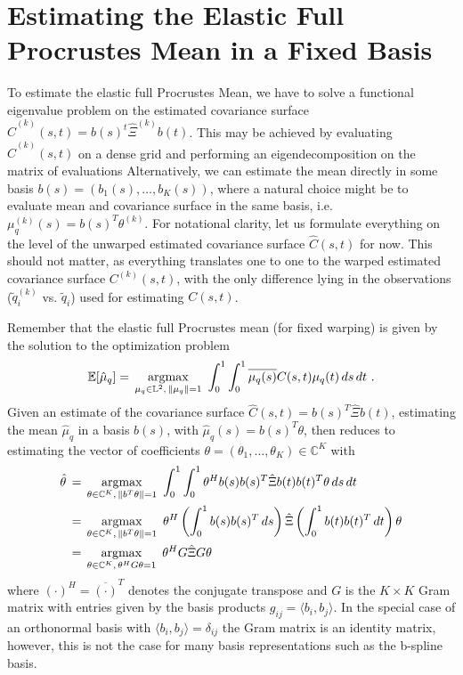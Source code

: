 \section{Estimating the Elastic Full Procrustes Mean in a Fixed Basis}
\label{sec:3-mean}
To estimate the elastic full Procrustes Mean, we have to solve a functional eigenvalue problem on the estimated covariance surface $\hat{C}^{(k)}(s,t) = b(s)^t \hat\Xi^{(k)} b(t)$.
This may be achieved by evaluating $\hat{C}^{(k)}(s,t)$ on a dense grid and performing an eigendecomposition on the matrix of evaluations 
Alternatively, we can estimate the mean directly in some basis $b(s) = (b_1(s),\dots,b_K(s))$, where a natural choice might be to evaluate mean and covariance surface in the same basis, i.e. $\mu^{(k)}_q(s) = b(s)^T \theta^{(k)}$.
For notational clarity, let us formulate everything on the level of the unwarped estimated covariance surface $\hat{C}(s,t)$ for now.
This should not matter, as everything translates one to one to the warped estimated covariance surface $C^{(k)}(s,t)$, with the only difference lying in the observations ($\widetilde q^{(k)}_i$ vs. $\widetilde q_i$) used for estimating $C(s,t)$.

 Remember that the elastic full Procrustes mean (for fixed warping) is given by the solution to the optimization problem
\begin{equation}
\mathbb{E}[\hat\mu_q] = \, \operatorname*{argmax}_{\mu_q \in \mathbb{L}^2,\,\lVert\mu_q\rVert = 1}\,\,
   \int_0^1 \int_0^1 \overline{\mu_q (s)} C(s,t) \mu_q(t) \,ds\,dt\,\,.
\end{equation}
Given an estimate of the covariance surface $\hat{C}(s,t) = b(s)^T \hat\Xi b(t)$, estimating  the mean $\hat \mu_q$ in a basis $b(s)$, with $\hat \mu_q (s) = b(s)^T \theta$, then reduces to estimating the vector of coefficients $\theta = (\theta_1, \dots, \theta_K) \in \mathbb{C}^K$ with
\begin{align}
  \hat\theta& \, = \, \operatorname*{argmax}_{\theta \in \mathbb{C}^K,\,\lVert b^T\theta\rVert = 1}\,\,
    \int_0^1 \int_0^1 \theta^H b(s) b(s)^T \hat\Xi b(t) b(t)^T \theta \,ds\,dt \\
  &\, = \, \operatorname*{argmax}_{\theta \in \mathbb{C}^K,\,\lVert b^T\theta\rVert = 1}\,\,
    \theta^H \left( \int_0^1 b(s) b(s)^T \,ds \right) \hat\Xi \left( \int_0^1 b(t) b(t)^T \,dt\right) \theta \\
  &\, = \, \operatorname*{argmax}_{\theta \in \mathbb{C}^K,\,\theta^H G \theta = 1}\,\,
    \theta^H G \hat\Xi G \theta 
\end{align}
where $(\cdot)^H = \overline{(\cdot)}^T$ denotes the conjugate transpose and $G$ is the $K \times K$ Gram matrix with entries given by the basis products $g_{ij} = \langle b_i, b_j \rangle$.
In the special case of an orthonormal basis with $\langle b_i, b_j \rangle = \delta_{ij}$ the Gram matrix is an identity matrix, however, this is not the case for many basis representations such as the b-spline basis.

